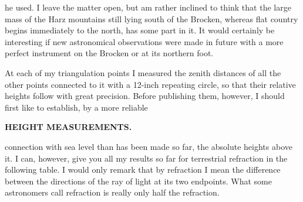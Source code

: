 he used. I leave the matter open, but am rather inclined to think that the large
mass of the Harz mountains still lying south of the Brocken, whereas flat country
begins immediately to the north, has some part in it. It would certainly be
interesting if new astronomical observations were made in future with a more
perfect instrument on the Brocken or at its northern foot.
\par\medskip\noindent\hspace*{\parindent}At each of my triangulation points I measured the zenith distances of all the other
points connected to it with a 12-inch repeating circle, so that their relative
heights follow with great precision. Before publishing them, however, I should
first like to establish, by a more reliable

\par\clearpage
\noindent\null\hfill{\small\textbf{HEIGHT MEASUREMENTS.}}\hfill{}\par\medskip
\noindent connection with sea level than has been made so far, the absolute heights above it.
I can, however, give you all my results so far for terrestrial refraction in the
following table. I would only remark that by refraction I mean the difference between
the directions of the ray of light at its two endpoints. What some astronomers call
refraction is really only half the refraction.
